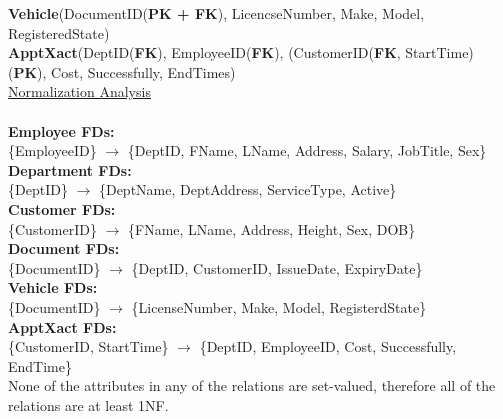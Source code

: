 \documentclass[12pt]{article}   %
\begin{document}
\textbf{Vehicle}(DocumentID(\textbf{PK + FK}), LicencseNumber, Make, Model, RegisteredState)\\

\textbf{ApptXact}(DeptID(\textbf{FK}), EmployeeID(\textbf{FK}), (CustomerID(\textbf{FK}, StartTime)(\textbf{PK}), Cost, Successfully, EndTimes)\\

\underline{Normalization Analysis}\\
\\
\textbf{Employee FDs:}\\
\{EmployeeID\} $\longrightarrow$ \{DeptID, FName, LName, Address, Salary, JobTitle, Sex\}\\

\textbf{Department FDs:}\\
\{DeptID\} $\longrightarrow$ \{DeptName, DeptAddress, ServiceType, Active\}\\

\textbf{Customer FDs:}\\
\{CustomerID\} $\longrightarrow$ \{FName, LName, Address, Height, Sex, DOB\}\\

\textbf{Document FDs:}\\
\{DocumentID\} $\longrightarrow$ \{DeptID, CustomerID, IssueDate, ExpiryDate\}\\

\textbf{Vehicle FDs:}\\
\{DocumentID\} $\longrightarrow$ \{LicenseNumber, Make, Model, RegisterdState\}\\

\textbf{ApptXact FDs:}\\
\{CustomerID, StartTime\} $\longrightarrow$ \{DeptID, EmployeeID, Cost, Successfully, EndTime\}\\

None of the attributes in any of the relations are set-valued, therefore all of the relations are at least 1NF.\\
\end{document}
